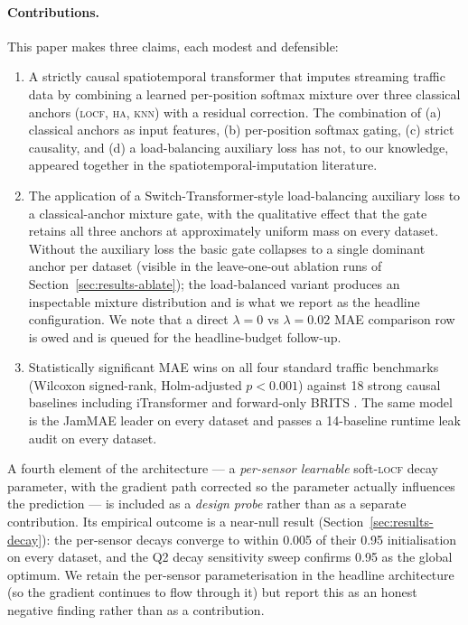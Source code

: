 \documentclass[11pt]{article}
\newcommand{\LOCF}{\textsc{locf}\xspace}
\newcommand{\HA}{\textsc{ha}\xspace}
\newcommand{\KNN}{\textsc{knn}\xspace}
\begin{document}
\paragraph{Contributions.}  This paper makes three claims, each modest
and defensible:
\begin{enumerate}
\item A strictly causal spatiotemporal transformer that imputes
streaming traffic data by combining a learned per-position softmax
mixture over three classical anchors (\LOCF, \HA, \KNN) with a residual
correction.  The combination of (a) classical anchors as input
features, (b) per-position softmax gating, (c) strict causality, and
(d) a load-balancing auxiliary loss has not, to our knowledge, appeared
together in the spatiotemporal-imputation literature.
\item The application of a Switch-Transformer-style load-balancing
auxiliary loss \citep{fedus2021switch} to a classical-anchor mixture
gate, with the qualitative effect that the gate retains all three
anchors at approximately uniform mass on every dataset.  Without the
auxiliary loss the basic gate collapses to a single dominant anchor
per dataset (visible in the leave-one-out ablation runs of
Section~\ref{sec:results-ablate}); the load-balanced variant produces
an inspectable mixture distribution and is what we report as the
headline configuration.  We note that a direct
$\lambda = 0$ vs $\lambda = 0.02$ MAE comparison row is owed and is
queued for the headline-budget follow-up.
\item Statistically significant MAE wins on all four standard traffic
benchmarks (Wilcoxon signed-rank, Holm-adjusted $p < 0.001$) against 18
strong causal baselines including iTransformer
\citep{liu2024itransformer} and forward-only BRITS \citep{cao2018brits}.
The same model is the JamMAE leader on every dataset and passes a
14-baseline runtime leak audit on every dataset.
\end{enumerate}

A fourth element of the architecture --- a \emph{per-sensor learnable}
soft-\LOCF decay parameter, with the gradient path corrected so the
parameter actually influences the prediction --- is included as a
\emph{design probe} rather than as a separate contribution.  Its
empirical outcome is a near-null result (Section~\ref{sec:results-decay}):
the per-sensor decays converge to within 0.005 of their 0.95
initialisation on every dataset, and the Q2 decay sensitivity sweep
confirms 0.95 as the global optimum.  We retain the per-sensor
parameterisation in the headline architecture (so the gradient continues
to flow through it) but report this as an honest negative finding rather
than as a contribution.
\end{document}

